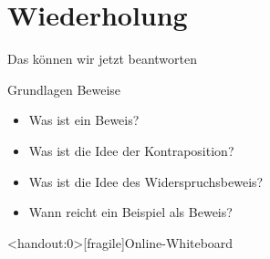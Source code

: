 

\section{Wiederholung}
\begin{frame}[fragile]{Das können wir jetzt beantworten}
    \begin{alertblock}{Grundlagen Beweise}
    \begin{itemize}
        \item Was ist ein Beweis?
        \item Was ist die Idee der Kontraposition?
        \item Was ist die Idee des Widerspruchsbeweis?
        \item Wann reicht ein Beispiel als Beweis?
    \end{itemize}
    \end{alertblock}
\end{frame}




\appendix
\begin{frame}<handout:0>[fragile]{Online-Whiteboard}
	\phantom{text}
\end{frame}


